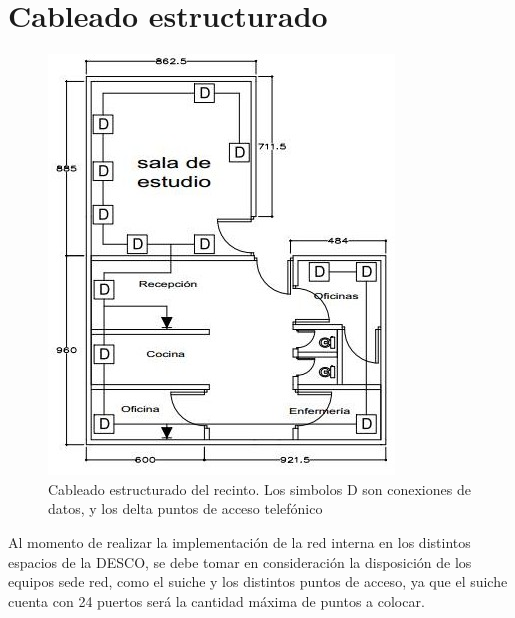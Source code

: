 \documentclass[11pt, a4paper, twosides]{report}
\begin{document}
\chapter{Cableado estructurado}
\begin{figure}[h]
    \centering
    \includegraphics[width=0.85\linewidth]{cableado.png}
    \caption{Cableado estructurado del recinto. Los simbolos D son conexiones de datos, y los delta puntos de acceso telefónico}
    \label{fig:cab}
\end{figure}
Al momento de realizar la implementación de la red interna en los distintos espacios de la DESCO, se debe tomar en consideración la disposición de los equipos sede red, como el suiche y los distintos puntos de acceso, ya que el suiche cuenta con 24 puertos será la cantidad máxima de puntos a colocar.
\end{document}

